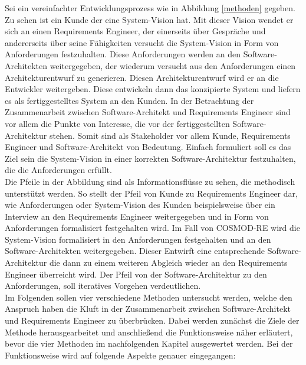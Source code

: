 Sei ein vereinfachter Entwicklungsprozess wie in Abbildung \ref{methoden} gegeben. Zu sehen ist ein Kunde der eine System-Vision hat. Mit dieser Vision wendet er sich an einen Requirements Engineer, der einerseits \"uber Gespr\"ache und andererseits \"uber seine F\"ahigkeiten versucht die System-Vision in Form von Anforderungen festzuhalten. Diese Anforderungen werden an den Software-Architekten weitergegeben, der wiederum versucht aus den Anforderungen einen Architekturentwurf zu generieren. Diesen Architekturentwurf wird er an die Entwickler weitergeben. Diese entwickeln dann das konzipierte System und liefern es als fertiggestelltes System an den Kunden. In der Betrachtung der Zusammenarbeit zwischen Software-Architekt und Requirements Engineer sind vor allem die Punkte von Interesse, die vor der fertiggestellten Software-Architektur stehen. Somit sind als Stakeholder vor allem Kunde, Requirements Engineer und Software-Architekt von Bedeutung. Einfach formuliert soll es das Ziel sein die System-Vision in einer korrekten Software-Architektur festzuhalten, die die Anforderungen erfüllt.\\

Die Pfeile in der Abbildung sind als Informationsflüsse zu sehen, die methodisch unterstützt werden. So stellt der Pfeil von Kunde zu Requirements Engineer dar, wie Anforderungen oder System-Vision des Kunden beispielsweise über ein Interview an den Requirements Engineer weitergegeben und in Form von Anforderungen formalisiert festgehalten wird. Im Fall von COSMOD-RE wird die System-Vision formalisiert in den Anforderungen festgehalten und an den Software-Architekten weitergegeben. Dieser Entwirft eine entsprechende Software-Architektur die dann zu einem weiteren Abgleich wieder an den Requirements Engineer überreicht wird. Der Pfeil von der Software-Architektur zu den Anforderungen, soll iteratives Vorgehen verdeutlichen.\\

Im Folgenden sollen vier verschiedene Methoden untersucht werden, welche den Anspruch haben die Kluft in der Zusammenarbeit zwischen Software-Architekt und Requirements Engineer zu \"uberbr\"ucken. Dabei werden zun\"achst die Ziele der Methode herausgearbeitet und anschlie\ss{}end die Funktionsweise n\"aher erl\"autert, bevor die vier Methoden im nachfolgenden Kapitel ausgewertet werden. Bei der Funktionsweise wird auf folgende Aspekte genauer eingegangen: \\


